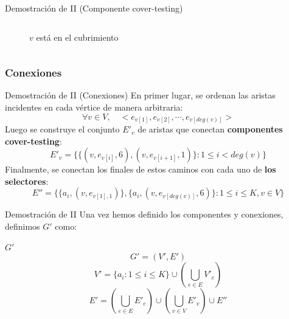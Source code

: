 \documentclass{beamer}
\begin{document}
\begin{frame}{Demostración de II (Componente cover-testing)}
\begin{columns}
\begin{figure}
            \caption{$v$ está en el cubrimiento}
            \label{fig:my_label}
        \end{figure}
    \end{columns}
\end{frame}

\subsubsection{Conexiones}
\begin{frame}{Demostración de II (Conexiones)}
    En primer lugar, se ordenan las aristas incidentes en cada vértice de manera arbitraria:
    \[\forall v \in V, \quad <e_{v[1]}, e_{v[2]}, \cdots, e_{v[deg(v)]}>\]
    Luego se construye el conjunto $E'_v$ de aristas que conectan \textbf{componentes cover-testing}:
    \[E'_v = \{\{(v, e_{v[i]}, 6), (v, e_{v[i+1]},1)\} : 1 \le i < deg(v)\}\]
    Finalmente, se conectan los finales de estos caminos con cada uno de \textbf{los selectores}:
    \[E'' = \{\{a_i, (v,e_{v[1], 1})\},\{a_i, (v,e_{v[deg(v)]}, 6)\} : 1 \le i \le K, v \in V \}\]
\end{frame}

\begin{frame}{Demostración de II}
    Una vez hemos definido los componentes y conexiones, definimos $G'$ como:
    \begin{block}{$G'$}
        \[G' = (V', E')\]
        \[V' = \{a_i : 1 \le i \le K\} \cup (\bigcup_{e \in E} V'_e)\]
        \[E' = (\bigcup_{e \in E} E'_e) \cup (\bigcup_{v \in V} E'_v) \cup E''\]
    \end{block}
\end{frame}
\end{document}
